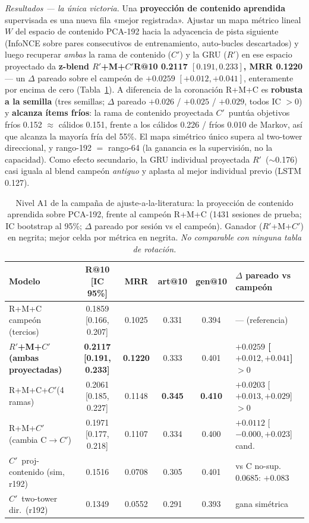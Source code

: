 \documentclass[11pt]{article}
\newcommand{\best}[1]{\textbf{#1}}
\newcommand{\Rp}{\ensuremath{R'}}
\newcommand{\Cp}{\ensuremath{C'}}
\begin{document}
\emph{Resultados --- la única victoria.} Una \textbf{proyección de contenido
aprendida} supervisada es una nueva fila «mejor registrada». Ajustar un mapa métrico
lineal $W$ del espacio de contenido PCA-192 hacia la adyacencia de pista siguiente
(InfoNCE sobre pares consecutivos de entrenamiento, auto-bucles descartados) y luego
recuperar \emph{ambas} la rama de contenido (\Cp) y la GRU (\Rp) en ese espacio
proyectado da \textbf{z-blend \Rp+M+\Cp R@10 \num{0.2117} $[0.191, 0.233]$, MRR
\num{0.1220}} --- un $\Delta$ pareado sobre el campeón de $+\num{0.0259}$ $[+0.012,
+0.041]$, enteramente por encima de cero (Tabla~\ref{tab:nexttrack-projection}). A
diferencia de la coronación R+M+C es \textbf{robusta a la semilla} (tres semillas;
$\Delta$ pareado $+\num{0.026}$ / $+\num{0.025}$ / $+\num{0.029}$, todos IC $>0$) y
\textbf{alcanza ítems fríos}: la rama de contenido proyectada \Cp\ puntúa objetivos
fríos \num{0.152} $\approx$ cálidos \num{0.151}, frente a los cálidos \num{0.226} /
fríos \num{0.010} de Markov, así que alcanza la mayoría fría del 55\%. El mapa
simétrico único supera al two-tower direccional, y rango-192 $=$ rango-64 (la ganancia
es la supervisión, no la capacidad). Como efecto secundario, la GRU individual
proyectada \Rp\ ($\sim$\num{0.176}) casi iguala al blend campeón \emph{antiguo} y
aplasta al mejor individual previo (LSTM \num{0.127}).

\begin{table}[ht]
  \centering
  \caption{Nivel A1 de la campaña de ajuste-a-la-literatura: la proyección de contenido
  aprendida sobre PCA-192, frente al campeón R+M+C (\num{1431} sesiones de prueba; IC
  bootstrap al 95\%; $\Delta$ pareado por sesión vs el campeón). Ganador (\Rp+M+\Cp) en
  negrita; mejor celda por métrica en negrita. \emph{No comparable con ninguna tabla de
  rotación.}}
  \label{tab:nexttrack-projection}
  {\footnotesize\setlength{\tabcolsep}{4pt}\begin{tabular}{lccccl}
    \toprule
    Modelo & R@10 [IC 95\%] & MRR & art@10 & gen@10 & $\Delta$ pareado vs campeón \\
    \midrule
    R+M+C campeón (tercios)           & 0.1859 [0.166, 0.207] & 0.1025 & 0.331 & 0.394 & --- (referencia) \\
    \best{\Rp+M+\Cp (ambas proyectadas)} & \best{0.2117 [0.191, 0.233]} & \best{0.1220} & 0.333 & 0.401 & \best{$+0.0259$ [$+0.012,+0.041$] $>0$} \\
    R+M+C+\Cp (4 ramas)               & 0.2061 [0.185, 0.227] & 0.1148 & \best{0.345} & \best{0.410} & $+0.0203$ [$+0.013,+0.029$] $>0$ \\
    R+M+\Cp (cambia C$\to$\Cp)        & 0.1971 [0.177, 0.218] & 0.1107 & 0.334 & 0.400 & $+0.0112$ [$-0.000,+0.023$] cand. \\
    \Cp\ proj-contenido (sim, r192)   & 0.1516 & 0.0708 & 0.305 & 0.401 & vs C no-sup. 0.0685: $+0.083$ \\
    \Cp\ two-tower dir.\ (r192)       & 0.1349 & 0.0552 & 0.291 & 0.393 & gana simétrica \\
    \bottomrule
  \end{tabular}}
\end{table}
\end{document}
